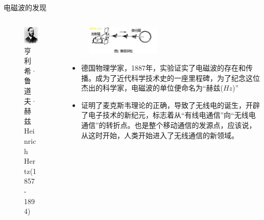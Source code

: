 \documentclass{ctexbeamer}
\begin{document}
\begin{frame}{电磁波的发现}
  \begin{columns}
    \begin{column}{0.35\linewidth}
      \begin{figure}
        \includegraphics[width=3.5cm]{hertz.jpg}
        \caption{亨利希·鲁道夫·赫兹 Heinrich Hertz(1857 - 1894)}
      \end{figure}
    \end{column}
    \begin{column}{0.65\linewidth}
      \begin{figure}
        \flushright
        \includegraphics[width=3.5cm]{hertzexperiment.jpg}
      \end{figure}
      \begin{itemize}
        \item 德国物理学家，1887年，实验证实了电磁波的存在和传播。成为了近代科学技术史的一座里程碑，为了纪念这位杰出的科学家，电磁波的单位便命名为“赫兹($Hz$)”
        \item 证明了麦克斯韦理论的正确，导致了无线电的诞生，开辟了电子技术的新纪元，标志着从“有线电通信”向“无线电通信”的转折点。也是整个移动通信的发源点，应该说，从这时开始，人类开始进入了无线通信的新领域。
      \end{itemize}
    \end{column}
  \end{columns}
\end{frame}
\end{document}
